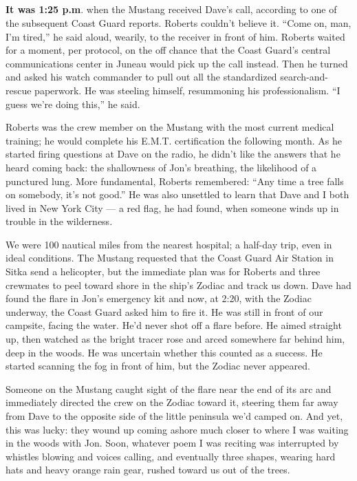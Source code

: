 \hypertarget{-1}{%
\subsection{}\label{-1}}

\textbf{It was 1:25 p.m}. when the Mustang received Dave's call,
according to one of the subsequent Coast Guard reports. Roberts couldn't
believe it. ``Come on, man, I'm tired,'' he said aloud, wearily, to the
receiver in front of him. Roberts waited for a moment, per protocol, on
the off chance that the Coast Guard's central communications center in
Juneau would pick up the call instead. Then he turned and asked his
watch commander to pull out all the standardized search-and-rescue
paperwork. He was steeling himself, resummoning his professionalism. ``I
guess we're doing this,'' he said.

Roberts was the crew member on the Mustang with the most current medical
training; he would complete his E.M.T. certification the following
month. As he started firing questions at Dave on the radio, he didn't
like the answers that he heard coming back: the shallowness of Jon's
breathing, the likelihood of a punctured lung. More fundamental, Roberts
remembered: ``Any time a tree falls on somebody, it's not good.'' He was
also unsettled to learn that Dave and I both lived in New York City ---
a red flag, he had found, when someone winds up in trouble in the
wilderness.

We were 100 nautical miles from the nearest hospital; a half-day trip,
even in ideal conditions. The Mustang requested that the Coast Guard Air
Station in Sitka send a helicopter, but the immediate plan was for
Roberts and three crewmates to peel toward shore in the ship's Zodiac
and track us down. Dave had found the flare in Jon's emergency kit and
now, at 2:20, with the Zodiac underway, the Coast Guard asked him to
fire it. He was still in front of our campsite, facing the water. He'd
never shot off a flare before. He aimed straight up, then watched as the
bright tracer rose and arced somewhere far behind him, deep in the
woods. He was uncertain whether this counted as a success. He started
scanning the fog in front of him, but the Zodiac never appeared.

Someone on the Mustang caught sight of the flare near the end of its arc
and immediately directed the crew on the Zodiac toward it, steering them
far away from Dave to the opposite side of the little peninsula we'd
camped on. And yet, this was lucky: they wound up coming ashore much
closer to where I was waiting in the woods with Jon. Soon, whatever poem
I was reciting was interrupted by whistles blowing and voices calling,
and eventually three shapes, wearing hard hats and heavy orange rain
gear, rushed toward us out of the trees.

